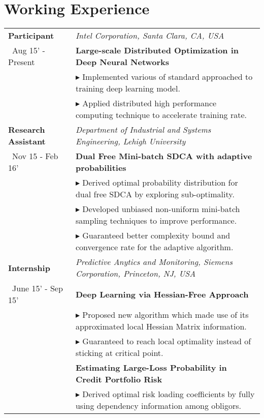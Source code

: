 \documentclass[letters,11pt]{article} %
\newcommand{\lst}[1]{\quad\footnotesize{$\blacktriangleright$ #1.}}
\begin{document}
\section{Working Experience}
\begin{longtable}{>{\centering}p{3.35cm}|p{14cm}}
    \small{\textbf{Participant}}& \textit{Intel Corporation, Santa Clara, CA, USA}\\\
    \small{Aug 15' - Present}&\textbf{Large-scale Distributed Optimization in Deep Neural Networks}\\
    & \lst{Implemented various of standard approached to training deep learning model}\\
    &\lst {Applied distributed high performance computing technique to accelerate training rate}\\
    \small{\textbf{Research Assistant}}& \textit{Department of Industrial and Systems Engineering, Lehigh University}\\\
    \small{Nov 15 - Feb 16'}&\textbf{Dual Free Mini-batch SDCA with adaptive probabilities}\\
    & \lst{Derived optimal probability distribution for dual free SDCA by exploring sub-optimality}\\
        &\lst {Developed unbiased non-uniform mini-batch sampling techniques to improve performance}\\
 & \lst{Guaranteed better complexity bound and convergence rate for the adaptive algorithm}\\
    \small{\textbf{Internship}}& \textit{Predictive Anytics and Monitoring, Siemens Corporation, Princeton, NJ, USA}\\\
    \small{June 15' - Sep 15'}&\textbf{Deep Learning via Hessian-Free Approach}\\
    & \lst{Proposed new algorithm which made use of its approximated local Hessian Matrix information}\\
    &\lst{Guaranteed to reach local optimality instead of sticking at critical point}\\
    & \textbf{Estimating Large-Loss Probability in Credit Portfolio Risk}   \\
    &  \lst{Derived optimal risk loading coefficients by fully using dependency information among obligors}\\

\end{longtable}
\end{document}
